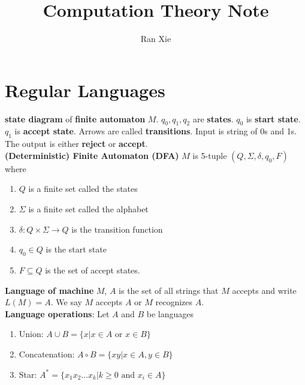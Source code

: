 \documentclass[12pt]{article}
\title{Computation Theory Note}
\author{Ran Xie}
\begin{document}
	\maketitle
\section{Regular Languages}


\textbf{state diagram} of \textbf{finite automaton} $M$. $q_0,q_1,q_2$ are \textbf{states}. $q_0$ is \textbf{start state}. $q_1$ is \textbf{accept state}. Arrows are called \textbf{transitions}. Input is string of 0s and 1s. The output is either \textbf{reject} or \textbf{accept}.\\

\textbf{(Deterministic) Finite Automaton (DFA)} $M$ is 5-tuple $(Q, \Sigma, \delta, q_0, F)$ where
\begin{enumerate}
	\item $Q$ is a finite set called the states
	\item $\Sigma$ is a finite set called the alphabet
	\item $\delta : Q \times \Sigma \rightarrow Q$ is the transition function
	\item $q_0 \in Q$ is the start state
	\item $F \subseteq Q$ is the set of accept states.
\end{enumerate}

\textbf{Language of machine }$M$, $A$ is the set of all strings that $M$ accepts and write $L(M) = A$. We say $M$ accepts $A$ or $M$ recognizes $A$. \\

\textbf{Language operations}: Let $A$ and $B$ be languages 
\begin{enumerate}
	\item Union: $A\cup B = \{x|x\in A \mbox{ or } x\in B\}$
	\item Concatenation: $A \circ B = \{xy| x\in A, y\in B\}$
	\item Star: $A^* = \{x_1x_2\ldots x_k| k \geq 0 \mbox{ and } x_i \in A \}$
\end{enumerate}
\end{document}
